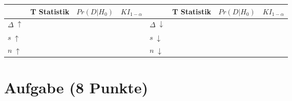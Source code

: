 \documentclass[a4paper, 10pt]{scrartcl}\usepackage[]{graphicx}\usepackage[]{color}
\begin{document}
\begin{center}
  \large
  \begin{tabular}[c]{l|l|l|l|l|l|l|l}
    & T Statistik & $Pr(D|H_0)$ & $KI_{1-\alpha}$ & & T Statistik & $Pr(D|H_0)$ & $KI_{1-\alpha}$\strut\\ 
    \hline
    \textbf{$\Delta\; \uparrow$} & \hspace{2cm} & \hspace{2cm}  & \hspace{2cm} & \textbf{
                                                          $\Delta\; \downarrow$} &
                                                                          \hspace{2cm} & \hspace{2cm}  & \hspace{2cm}\strut\\
    \hline
        \textbf{$s\; \uparrow$} & \hspace{2cm} & \hspace{2cm}  & \hspace{2cm} & \textbf{
                                                          $s\; \downarrow$} &
                                                                          \hspace{2cm}
                                                & \hspace{2cm}  & \hspace{2cm}\strut\\
    \hline
        \textbf{$n\; \uparrow$} & \hspace{2cm} & \hspace{2cm}  & \hspace{2cm} & \textbf{
                                                          $n\; \downarrow$} &
                                                                          \hspace{2cm}
                                                & \hspace{2cm}  & \hspace{2cm}\strut\\
    \hline
  \end{tabular}
\end{center}
 
\clearpage

\section{Aufgabe \hfill (8 Punkte)}
\end{document}
